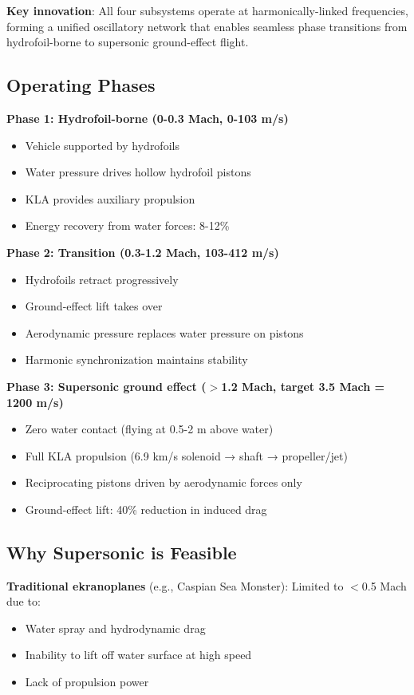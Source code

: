 \documentclass[12pt,a4paper]{article}
\begin{document}
\textbf{Key innovation}: All four subsystems operate at harmonically-linked frequencies, forming a unified oscillatory network that enables seamless phase transitions from hydrofoil-borne to supersonic ground-effect flight.

\subsection{Operating Phases}

\textbf{Phase 1: Hydrofoil-borne (0-0.3 Mach, 0-103 m/s)}
\begin{itemize}
\item Vehicle supported by hydrofoils
\item Water pressure drives hollow hydrofoil pistons
\item KLA provides auxiliary propulsion
\item Energy recovery from water forces: 8-12\%
\end{itemize}

\textbf{Phase 2: Transition (0.3-1.2 Mach, 103-412 m/s)}
\begin{itemize}
\item Hydrofoils retract progressively
\item Ground-effect lift takes over
\item Aerodynamic pressure replaces water pressure on pistons
\item Harmonic synchronization maintains stability
\end{itemize}

\textbf{Phase 3: Supersonic ground effect ($>$1.2 Mach, target 3.5 Mach = 1200 m/s)}
\begin{itemize}
\item Zero water contact (flying at 0.5-2 m above water)
\item Full KLA propulsion (6.9 km/s solenoid → shaft → propeller/jet)
\item Reciprocating pistons driven by aerodynamic forces only
\item Ground-effect lift: 40\% reduction in induced drag
\end{itemize}

\subsection{Why Supersonic is Feasible}

\textbf{Traditional ekranoplanes} (e.g., Caspian Sea Monster): Limited to $<$0.5 Mach due to:
\begin{itemize}
\item Water spray and hydrodynamic drag
\item Inability to lift off water surface at high speed
\item Lack of propulsion power
\end{itemize}
\end{document}

